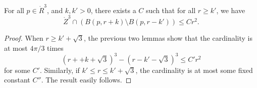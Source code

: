 \begin{lemma}
For all $p\in\ring{R}^3$, and $k,k'>0$, there exists a $C$ such
that for all $r\ge k'$, we have
    $$
    \ring{Z}^3 \cap (B(p,r+k) \setminus B(p,r-k')) \le C r^2.
    $$
\end{lemma}

\begin{proof}  When $r \ge k'+\sqrt3$, the previous two lemmas show
that the cardinality is at most $4\pi/3$ times
    $$(r + +k + \sqrt3)^3 - (r - k' - \sqrt3)^3 \le C' r^2$$
for some $C'$.  Similarly, if $k'\le r\le k'+\sqrt3$, the
cardinality is at most some fixed constant $C''$.  The result
easily follows.
\end{proof}

